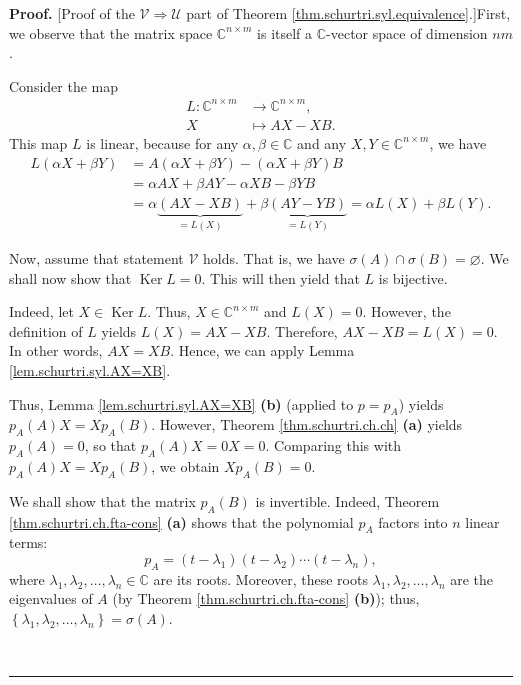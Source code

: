 \documentclass[numbers=enddot,12pt,final,onecolumn,notitlepage]{scrartcl}%
\numberwithin{exer}{subsection}
\theoremstyle{definition}
\newenvironment{proof}[1][Proof]{\noindent\textbf{#1.} }{\ \rule{0.5em}{0.5em}}
\begin{document}
\begin{proof}
[Proof of the $\mathcal{V}\Longrightarrow\mathcal{U}$ part of Theorem
\ref{thm.schurtri.syl.equivalence}.]First, we observe that the matrix space
$\mathbb{C}^{n\times m}$ is itself a $\mathbb{C}$-vector space of dimension
$nm$.

Consider the map%
\begin{align*}
L:\mathbb{C}^{n\times m}  &  \rightarrow\mathbb{C}^{n\times m},\\
X  &  \mapsto AX-XB.
\end{align*}
This map $L$ is linear, because for any $\alpha,\beta\in\mathbb{C}$ and any
$X,Y\in\mathbb{C}^{n\times m}$, we have%
\begin{align*}
L\left(  \alpha X+\beta Y\right)   &  =A\left(  \alpha X+\beta Y\right)
-\left(  \alpha X+\beta Y\right)  B\\
&  =\alpha AX+\beta AY-\alpha XB-\beta YB\\
&  =\alpha\underbrace{\left(  AX-XB\right)  }_{=L\left(  X\right)  }%
+\beta\underbrace{\left(  AY-YB\right)  }_{=L\left(  Y\right)  }=\alpha
L\left(  X\right)  +\beta L\left(  Y\right)  .
\end{align*}


Now, assume that statement $\mathcal{V}$ holds. That is, we have
$\sigma\left(  A\right)  \cap\sigma\left(  B\right)  =\varnothing$. We shall
now show that $\operatorname*{Ker}L=0$. This will then yield that $L$ is bijective.

Indeed, let $X\in\operatorname*{Ker}L$. Thus, $X\in\mathbb{C}^{n\times m}$ and
$L\left(  X\right)  =0$. However, the definition of $L$ yields $L\left(
X\right)  =AX-XB$. Therefore, $AX-XB=L\left(  X\right)  =0$. In other words,
$AX=XB$. Hence, we can apply Lemma \ref{lem.schurtri.syl.AX=XB}.

Thus, Lemma \ref{lem.schurtri.syl.AX=XB} \textbf{(b)} (applied to $p=p_{A}$)
yields $p_{A}\left(  A\right)  X=Xp_{A}\left(  B\right)  $. However, Theorem
\ref{thm.schurtri.ch.ch} \textbf{(a)} yields $p_{A}\left(  A\right)  =0$, so
that $p_{A}\left(  A\right)  X=0X=0$. Comparing this with $p_{A}\left(
A\right)  X=Xp_{A}\left(  B\right)  $, we obtain $Xp_{A}\left(  B\right)  =0$.

We shall show that the matrix $p_{A}\left(  B\right)  $ is invertible. Indeed,
Theorem \ref{thm.schurtri.ch.fta-cons} \textbf{(a)} shows that the polynomial
$p_{A}$ factors into $n$ linear terms:%
\begin{equation}
p_{A}=\left(  t-\lambda_{1}\right)  \left(  t-\lambda_{2}\right)
\cdots\left(  t-\lambda_{n}\right)  ,
\label{pf.thm.schurtri.syl.equivalence.pA=prod}%
\end{equation}
where $\lambda_{1},\lambda_{2},\ldots,\lambda_{n}\in\mathbb{C}$ are its roots.
Moreover, these roots $\lambda_{1},\lambda_{2},\ldots,\lambda_{n}$ are the
eigenvalues of $A$ (by Theorem \ref{thm.schurtri.ch.fta-cons} \textbf{(b)});
thus, $\left\{  \lambda_{1},\lambda_{2},\ldots,\lambda_{n}\right\}
=\sigma\left(  A\right)  $.


\end{proof}
\end{document}
